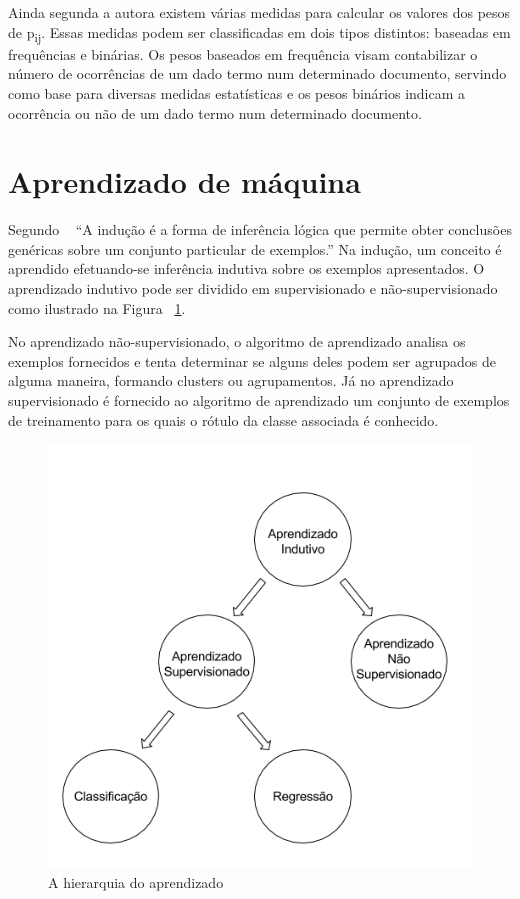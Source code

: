 Ainda segunda a autora existem várias medidas para calcular os valores dos pesos de p\textsubscript{ij}. Essas medidas podem ser classificadas em dois tipos distintos: baseadas em frequências e binárias. Os pesos baseados em frequência visam contabilizar o número de ocorrências de um dado termo num determinado documento, servindo como base para diversas medidas estatísticas e os pesos binários indicam a ocorrência ou não de um dado termo num determinado documento.

\section{Aprendizado de máquina}

Segundo ~\cite{monard_baranauskas:2003} ``A indução é a forma de inferência lógica que permite obter conclusões genéricas sobre um conjunto particular de exemplos.'' Na indução, um conceito é aprendido efetuando-se inferência indutiva sobre os exemplos apresentados. O aprendizado indutivo pode ser dividido em supervisionado e não-supervisionado como ilustrado na Figura ~\ref{fig:aprendizado_maquina}.  

No aprendizado não-supervisionado, o algoritmo de aprendizado analisa os exemplos fornecidos e tenta determinar se alguns deles podem ser agrupados de alguma maneira, formando clusters ou agrupamentos. Já no aprendizado supervisionado é fornecido ao algoritmo de aprendizado um conjunto de exemplos de treinamento para os quais o rótulo da classe associada é conhecido.

\begin{figure}[H]
\begin{center}
    \includegraphics[scale=0.75]{figuras/aprendizado_maquina.png}
\end{center}
\caption{A hierarquia do aprendizado}
\label{fig:aprendizado_maquina}
\end{figure}


